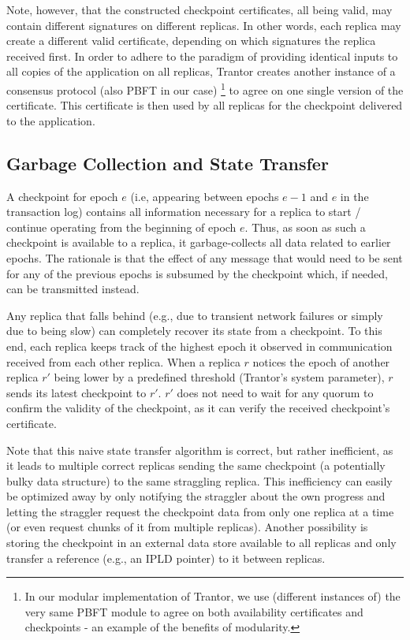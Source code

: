 \documentclass{article}
\begin{document}
Note, however, that the constructed checkpoint certificates, all being valid,
may contain different signatures on different replicas.
In other words, each replica may create a different valid certificate,
depending on which signatures the replica received first.
In order to adhere to the paradigm of providing identical inputs to all copies of the application on all replicas,
Trantor creates another instance of a consensus protocol (also PBFT in our case)%
\footnote{In our modular implementation of Trantor, we use (different instances of) the very same PBFT module
to agree on both availability certificates and checkpoints - an example of the benefits of modularity.}
to agree on one single version of the certificate.
This certificate is then used by all replicas for the checkpoint delivered to the application.

\subsection{Garbage Collection and State Transfer}

A checkpoint for epoch $e$ (i.e, appearing between epochs $e-1$ and $e$ in the transaction log)
contains all information necessary for a replica to start / continue operating from the beginning of epoch $e$.
Thus, as soon as such a checkpoint is available to a replica, it garbage-collects all data related to earlier epochs.
The rationale is that the effect of any message that would need to be sent for any of the previous epochs is subsumed by the checkpoint which,
if needed, can be transmitted instead.

Any replica that falls behind (e.g., due to transient network failures or simply due to being slow) can completely recover its state from a checkpoint.
To this end, each replica keeps track of the highest epoch it observed in communication received from each other replica.
When a replica $r$ notices the epoch of another replica $r'$ being lower by a predefined threshold (Trantor’s system parameter),
$r$ sends its latest checkpoint to $r'$.
$r'$ does not need to wait for any quorum to confirm the validity of the checkpoint, as it can verify the received checkpoint’s certificate.

Note that this naive state transfer algorithm is correct, but rather inefficient,
as it leads to multiple correct replicas sending the same checkpoint (a potentially bulky data structure) to the same straggling replica.
This inefficiency can easily be optimized away by only notifying the straggler about the own progress
and letting the straggler request the checkpoint data from only one replica at a time (or even request chunks of it from multiple replicas).
Another possibility is storing the checkpoint in an external data store available to all replicas
and only transfer a reference (e.g., an IPLD pointer) to it between replicas.
\end{document}
